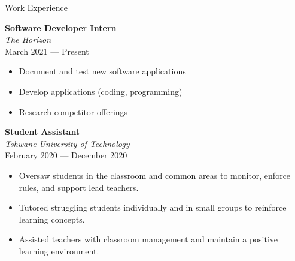 \documentclass{resume} %
\newcommand{\sepspace}{\vspace*{0.5em}}           %
\begin{document}
\begin{rSection}{Work Experience}

        \textbf{Software Developer Intern} \\
        \textsl{The Horizon} \\
        \textmd{March 2021 --- Present}
        \begin{itemize}[noitemsep,topsep=-6pt]
          \item  Document and test new software applications
          \item  Develop applications (coding, programming)
          \item  Research competitor offerings
        \end{itemize}

        \sepspace

        \textbf{Student Assistant} \\
        \textsl{Tshwane University of Technology} \\
        \textmd{February 2020 --- December 2020}
        \begin{itemize}[noitemsep,topsep=-6pt]
          \item  Oversaw students in the classroom and common areas to monitor, enforce rules, and support lead teachers.
          \item  Tutored struggling students individually and in small groups to reinforce learning concepts.
          \item  Assisted teachers with classroom management and maintain a positive learning environment. 
        \end{itemize}



\end{rSection}
\end{document}
